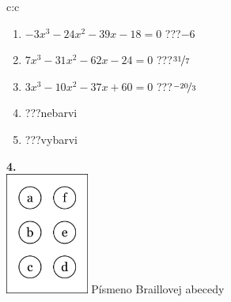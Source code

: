 \documentclass[10pt]{report}
\begin{document}
\begin{tabular}{c:c}
\begin{minipage}[c][104.5mm][t]{0.5\linewidth}
\begin{center}
\begin{minipage}{0.79\linewidth}
\begin{center}
\begin{varwidth}{\linewidth}
\begin{enumerate}
\item $-3x^3-24x^2-39x-18=0$\quad \dotfill\; ???\;\dotfill \quad $-6$
\item $7x^3-31x^2-62x-24=0$\quad \dotfill\; ???\;\dotfill \quad $\nicefrac{31}{7}$
\item $3x^3-10x^2-37x+60=0$\quad \dotfill\; ???\;\dotfill \quad $\nicefrac{-20}{3}$
\item \quad \dotfill\; ???\;\dotfill \quad nebarvi
\item \quad \dotfill\; ???\;\dotfill \quad vybarvi
\end{enumerate}
\end{varwidth}
\end{center}
\end{minipage}
\begin{minipage}{0.20\linewidth}
\begin{center}
{\Huge\bfseries 4.} \\[2mm]
\includegraphics[height=40mm]{../images/braille.png}
{\small Písmeno Braillovej abecedy}
\end{center}
\end{minipage}
\end{center}
\end{minipage}
%
\end{tabular}
\newpage
\thispagestyle{empty}
\end{document}
